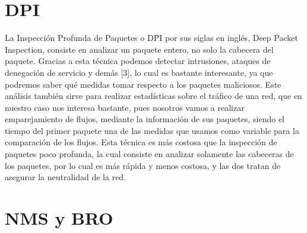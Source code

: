 {{{\section{DPI}

La Inspección Profunda de Paquetes o DPI por sus siglas en inglés, Deep 
Packet Inspection, consiste en analizar un paquete entero, no solo la 
cabecera del paquete. Gracias a esta técnica podemos detectar intrusiones, 
ataques de denegación de servicio y demás [3], lo cual es bastante 
interesante, ya que podremos saber qué medidas tomar respecto a los 
paquetes maliciosos. Este análisis también sirve para realizar estadísticas 
sobre el tráfico de una red, que en nuestro caso nos interesa bastante, 
pues nosotros vamos a realizar emparejamiento de flujos, mediante la 
información de sus paquetes, siendo el tiempo del primer paquete una de las 
medidas que usamos como variable para la comparación de los flujos. Esta 
técnica es más costosa que la inspección de paquetes poco profunda, la 
cual consiste en analizar solamente las cabeceras de los paquetes, por 
lo cual es más rápida y menos costosa, y las dos tratan de asegurar 
la neutralidad de la red.

\section{NMS y BRO}

}}}
